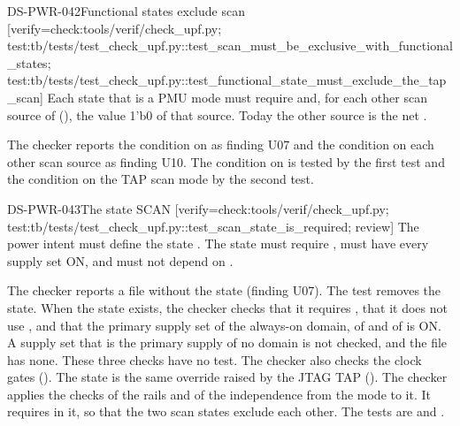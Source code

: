 \begin{requirement}{DS-PWR-042}{Functional states exclude scan}
[verify={check:tools/verif/check_upf.py; test:tb/tests/test_check_upf.py::test_scan_must_be_exclusive_with_functional_states; test:tb/tests/test_check_upf.py::test_functional_state_must_exclude_the_tap_scan}]
Each state that is a PMU mode must require  and, for each other scan source of  (), the value 1'b0 of that source. Today the other source is the net .
\end{requirement}
\begin{information}
The checker reports the condition on  as finding U07 and the condition on each other scan source as finding U10. The condition on  is tested by the first test and the condition on the TAP scan mode by the second test.
\end{information}

\begin{requirement}{DS-PWR-043}{The state SCAN}
[verify={check:tools/verif/check_upf.py; test:tb/tests/test_check_upf.py::test_scan_state_is_required; review}]
The power intent must define the state . The state  must require , must have every supply set ON, and must not depend on .
\end{requirement}
\begin{information}
The checker reports a file without the state  (finding U07). The test removes the state. When the state exists, the checker checks that it requires , that it does not use , and that the primary supply set of the always-on domain, of  and of  is ON. A supply set that is the primary supply of no domain is not checked, and the file has none. These three checks have no test. The checker also checks the clock gates (). The state  is the same override raised by the JTAG TAP (). The checker applies the checks of the rails and of the independence from the mode to it. It requires  in it, so that the two scan states exclude each other. The tests are  and .
\end{information}

